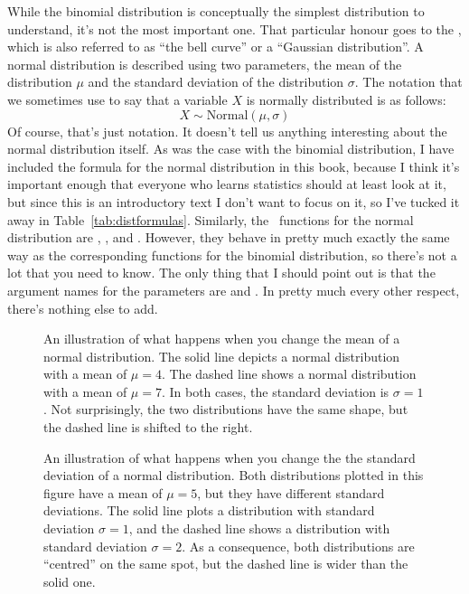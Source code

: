 While the binomial distribution is conceptually the simplest distribution to understand, it's not the most important one. That particular honour goes to the , which is also referred to as ``the bell curve'' or a ``Gaussian distribution''. A normal distribution is described using two parameters, the mean of the distribution $\mu$ and the standard deviation of the distribution $\sigma$. The notation that we sometimes use to say that a variable $X$ is normally distributed is as follows:
$$
X \sim \mbox{Normal}(\mu,\sigma)
$$
Of course, that's just notation. It doesn't tell us anything interesting about the normal distribution itself. As was the case with the binomial distribution, I have included the formula for the normal distribution in this book, because I think it's important enough that everyone who learns statistics should at least look at it, but since this is an introductory text I don't want to focus on it, so I've tucked it away in Table~\ref{tab:distformulas}. Similarly, the \R\ functions for the normal distribution are , ,  and . However, they behave in pretty much exactly the same way as the corresponding functions for the binomial distribution, so there's not a lot that you need to know. The only thing that I should point out is that the argument names for the parameters are  and . In pretty much every other respect, there's nothing else to add.


\begin{figure}[t]
\begin{center}
\caption{An illustration of what happens when you change the mean of a normal distribution. The solid line depicts a normal distribution with a mean of $\mu=4$. The dashed line shows a normal distribution with a mean of $\mu=7$. In both cases, the standard deviation is $\sigma=1$. Not surprisingly, the two distributions have the same shape, but the dashed line is shifted to the right.}
\label{fig:normmean}
\HR
\end{center}
\end{figure}



\begin{figure}[t]
\begin{center}
\caption{An illustration of what happens when you change the the standard deviation of a normal distribution. Both distributions plotted in this figure have a mean of $\mu = 5$, but they have different standard deviations. The solid line plots a distribution with standard deviation $\sigma=1$, and the dashed line shows a distribution with standard deviation $\sigma = 2$. As a consequence, both distributions are ``centred'' on the same spot, but the dashed line is wider than the solid one.}
\label{fig:normsd}
\HR
\end{center}
\end{figure}

